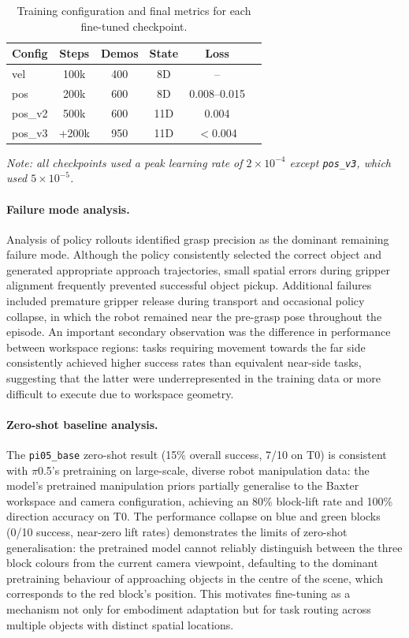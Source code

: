 \documentclass[12pt]{article}
\begin{document}
\begin{table}[H]
\centering
\caption{Training configuration and final metrics for each fine-tuned checkpoint.}
\label{tab:training_metrics}
\begin{tabular}{lccccc}
\toprule
\textbf{Config} & \textbf{Steps} & \textbf{Demos} & \textbf{State} & \textbf{Loss} \\
\midrule
vel & 100k & 400 & 8D & -- \\
pos & 200k & 600 & 8D & 0.008--0.015 \\
pos\_v2 & 500k & 600 & 11D & 0.004 \\
pos\_v3 & +200k & 950 & 11D & $<$0.004 \\
\bottomrule
\end{tabular}
\par\footnotesize\emph{Note: all checkpoints used a peak learning rate of $2\times10^{-4}$ except \texttt{pos\_v3}, which used $5\times10^{-5}$.}
\end{table}

\paragraph{Failure mode analysis.} Analysis of policy rollouts identified grasp precision as the dominant remaining failure mode. Although the policy consistently selected the correct object and generated appropriate approach trajectories, small spatial errors during gripper alignment frequently prevented successful object pickup. Additional failures included premature gripper release during transport and occasional policy collapse, in which the robot remained near the pre-grasp pose throughout the episode. An important secondary observation was the difference in performance between workspace regions: tasks requiring movement towards the far side consistently achieved higher success rates than equivalent near-side tasks, suggesting that the latter were underrepresented in the training data or more difficult to execute due to workspace geometry.

\paragraph{Zero-shot baseline analysis.} The \texttt{pi05\_base} zero-shot result (15\% overall success, 7/10 on T0) is consistent with $\pi$0.5's pretraining on large-scale, diverse robot manipulation data: the model's pretrained manipulation priors partially generalise to the Baxter workspace and camera configuration, achieving an 80\% block-lift rate and 100\% direction accuracy on T0. The performance collapse on blue and green blocks (0/10 success, near-zero lift rates) demonstrates the limits of zero-shot generalisation: the pretrained model cannot reliably distinguish between the three block colours from the current camera viewpoint, defaulting to the dominant pretraining behaviour of approaching objects in the centre of the scene, which corresponds to the red block's position. This motivates fine-tuning as a mechanism not only for embodiment adaptation but for task routing across multiple objects with distinct spatial locations.
\end{document}
